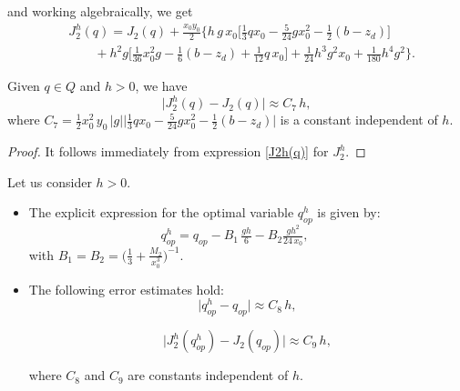 \documentclass[axioms,article,submit,moreauthors]{Definitions/mdpi}
\begin{document}
  \noindent and working algebraically, we get
  \begin{equation}\label{J2h(q)}
    \begin{array}{ll}
  &  {J^h_2}(q)=J_2(q)+\tfrac{x_0 y_0}{2}\Big\{  h \,g \,x_0 \Big[\tfrac{1}{3}q x_0 - \tfrac{5}{24} g x_0^2 - \tfrac{1}{2} (b-z_d)\Big] \\[0.45cm]
    & \qquad + h^2 g \Big[\tfrac{1}{36} x_0^2 g- \tfrac{1}{6}(b-z_d) + \tfrac{1}{12} q \,x_0\Big] + \tfrac{1}{24}  h^3g^2 x_0 + \tfrac{1}{180}  h^4  g^2\Big\}.    
    \end{array}    
  \end{equation}

\begin{Lemma}\label{Lema J2 J2h}
Given $q\in Q$ and $h>0$, we have
     \begin{equation}\label{ec 4.3} 
        \lvert  {J^h_2}(q) - J_2(q) \rvert  \approx C_7 \, h,
     \end{equation}
     where $C_7 = \tfrac{1}{2}x_0^2\, y_0\,|g| \Big \lvert  \tfrac{1}{3}q x_0-\tfrac{5}{24} gx_0^2-\tfrac{1}{2}(b-z_d) \Big \rvert$ is a constant independent of $h.$
      \end{Lemma}
      
\begin{proof}
It follows immediately from expression \eqref{J2h(q)} for ${J^h_2}$.
   \end{proof}

     
  
 
      
\begin{Lemma} Let us consider $h>0.$
    
     \begin{itemize}
      \item[(a)]  The explicit expression for the optimal variable ${q^h_{op}} $ is given by:     
     \begin{equation}\label{qhop}
      {q^h_{op}} =q_{op} - B_1 \,\tfrac{g h}{6} - B_2 \tfrac{g h^2}{24\,x_0} , \qquad 
     \end{equation}
     with   $B_1=B_2=\Big(\tfrac{1}{3} + \tfrac{M_2}{x_0^3}\Big)^{-1}.$
     
     \noindent 
     
      \item[(b)]The following error estimates hold:
     		\begin{equation}\label{qhop-qoo}
     		\lvert {q^h_{op}} - q_{op} \rvert \approx C_8 \, h  ,
     		\end{equation}
     	
     		\begin{equation}\label{J2hqhop-J2qop}
     	    \Big \lvert  {J^h_2}({q^h_{op}}) -  J_{2}(q_{op}) \Big \rvert \approx C_9 \, h,
     	    \end{equation}
     		
        where $C_8$  and $C_9$ are  constants independent of $h$.
     
     \end{itemize}
    \end{Lemma}
    
\end{document}
